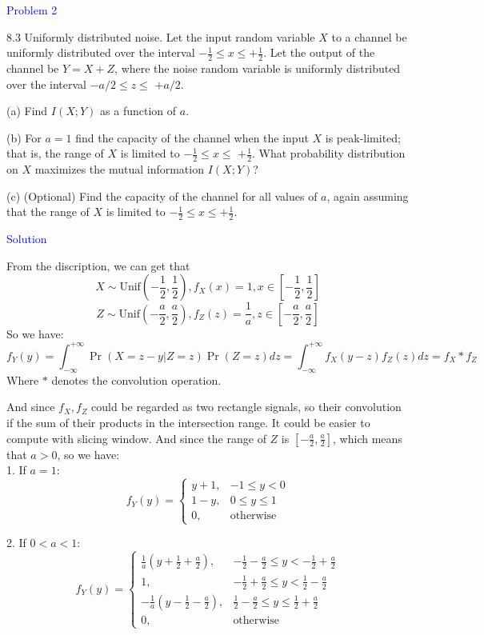 \textcolor{blue}{Problem 2}

8.3 Uniformly distributed noise. Let the input random variable $X$ to a channel be uniformly distributed over the interval $-\frac{1}{2} \leq x \leq+\frac{1}{2}$. Let the output of the channel be $Y=X+Z$, where the noise random variable is uniformly distributed over the interval $-a / 2 \leq z \leq$ $+a / 2$.

(a) Find $I(X ; Y)$ as a function of $a$.

(b) For $a=1$ find the capacity of the channel when the input $X$ is peak-limited; that is, the range of $X$ is limited to $-\frac{1}{2} \leq x \leq$ $+\frac{1}{2}$. What probability distribution on $X$ maximizes the mutual information $I(X ; Y)$?

(c) (Optional) Find the capacity of the channel for all values of $a$, again assuming that the range of $X$ is limited to $-\frac{1}{2} \leq x \leq+\frac{1}{2}$.

\textcolor{blue}{Solution}

From the discription, we can get that
$$X\sim\text{Unif}\left(-\frac{1}{2},\frac{1}{2}\right), f_X(x)=1,x\in\left[-\frac{1}{2},\frac{1}{2}\right]$$
$$Z\sim\text{Unif}\left(-\frac{a}{2},\frac{a}{2}\right), f_Z(z)=\frac{1}{a},z\in\left[-\frac{a}{2},\frac{a}{2}\right]$$
So we have:
$$f_Y(y) = \int_{-\infty}^{+\infty}\Pr\left(X=z-y|Z=z\right)\Pr(Z=z)dz=\int_{-\infty}^{+\infty}f_X(y-z)f_Z(z)dz = f_X * f_Z $$
Where $*$ denotes the convolution operation.

And since $f_X,f_Z$ could be regarded as two rectangle signals, so their convolution if the sum of their products in the intersection range. It could be easier to compute with slicing window. And since the range of $Z$ is $[-\frac{a}{2},\frac{a}{2}]$, which means that $a>0$, so we have: \\
1. If $a = 1$: \\
$$f_Y(y)=\begin{cases}
y+1, & -1 \leq y < 0 \\
1-y, & 0 \leq y \leq 1 \\
0, &\text{otherwise}
\end{cases}$$

2. If $0<a<1$: \\
$$f_Y(y)=\begin{cases}
\frac{1}{a}\left(y+\frac{1}{2}+\frac{a}{2}\right), & -\frac{1}{2}-\frac{a}{2}\leq y<-\frac{1}{2}+\frac{a}{2} \\
1, & -\frac{1}{2}+\frac{a}{2}\leq y<\frac{1}{2}-\frac{a}{2} \\
-\frac{1}{a}\left(y-\frac{1}{2}-\frac{a}{2}\right), & \frac{1}{2}-\frac{a}{2}\leq y\leq\frac{1}{2}+\frac{a}{2} \\
0, & \text{otherwise}
\end{cases}$$

